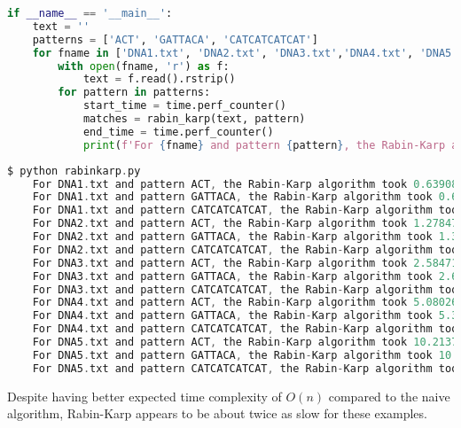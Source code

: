 \documentclass[12pt]{article}
\newenvironment{problem}[2][Problem]{\begin{trivlist}
\item[\hskip \labelsep {\bfseries #1}\hskip \labelsep {\bfseries #2.}]}{\end{trivlist}}
\begin{document}
\begin{problem}{2}
\begin{lstlisting}[language=Python, caption=main function code]
if __name__ == '__main__':
    text = ''
    patterns = ['ACT', 'GATTACA', 'CATCATCATCAT']
    for fname in ['DNA1.txt', 'DNA2.txt', 'DNA3.txt','DNA4.txt', 'DNA5.txt']:
        with open(fname, 'r') as f:
            text = f.read().rstrip()
        for pattern in patterns:
            start_time = time.perf_counter()
            matches = rabin_karp(text, pattern)
            end_time = time.perf_counter()
            print(f'For {fname} and pattern {pattern}, the Rabin-Karp algorithm took {end_time-start_time} seconds with {len(matches)} matches')
\end{lstlisting}
\pagebreak
\begin{lstlisting}[language=C, caption=Terminal output running code]
$ python rabinkarp.py 
    For DNA1.txt and pattern ACT, the Rabin-Karp algorithm took 0.639081138993788 seconds with 65495 matches
    For DNA1.txt and pattern GATTACA, the Rabin-Karp algorithm took 0.6668751739998697 seconds with 242 matches
    For DNA1.txt and pattern CATCATCATCAT, the Rabin-Karp algorithm took 0.7319347989978269 seconds with 0 matches
    For DNA2.txt and pattern ACT, the Rabin-Karp algorithm took 1.2784735669993097 seconds with 131034 matches
    For DNA2.txt and pattern GATTACA, the Rabin-Karp algorithm took 1.3436157860051026 seconds with 491 matches
    For DNA2.txt and pattern CATCATCATCAT, the Rabin-Karp algorithm took 1.4682704229999217 seconds with 1 matches
    For DNA3.txt and pattern ACT, the Rabin-Karp algorithm took 2.5847115970027517 seconds with 262192 matches
    For DNA3.txt and pattern GATTACA, the Rabin-Karp algorithm took 2.6529827709964593 seconds with 1002 matches
    For DNA3.txt and pattern CATCATCATCAT, the Rabin-Karp algorithm took 2.936001311005384 seconds with 1 matches
    For DNA4.txt and pattern ACT, the Rabin-Karp algorithm took 5.080261541996151 seconds with 524454 matches
    For DNA4.txt and pattern GATTACA, the Rabin-Karp algorithm took 5.316721924995363 seconds with 1976 matches
    For DNA4.txt and pattern CATCATCATCAT, the Rabin-Karp algorithm took 5.90457762600272 seconds with 5 matches
    For DNA5.txt and pattern ACT, the Rabin-Karp algorithm took 10.213705198999378 seconds with 1050689 matches
    For DNA5.txt and pattern GATTACA, the Rabin-Karp algorithm took 10.634073597997485 seconds with 4161 matches
    For DNA5.txt and pattern CATCATCATCAT, the Rabin-Karp algorithm took 11.496143873002438 seconds with 3 matches
\end{lstlisting}
Despite having better expected time complexity of $O(n)$ compared to the naive algorithm, Rabin-Karp appears to be about twice as slow for these examples.
\end{problem}
\end{document}
